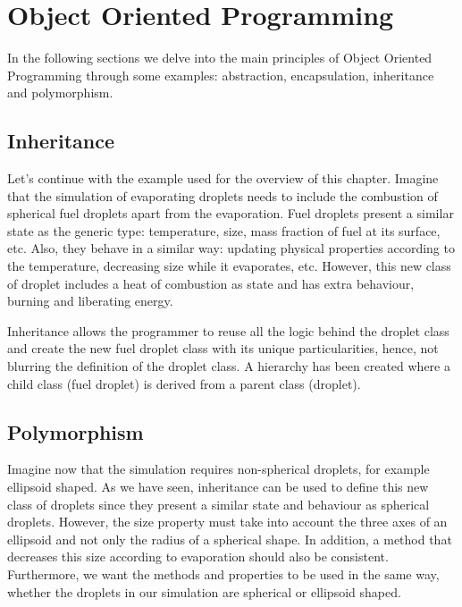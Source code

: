 \chapter{Object Oriented Programming} 


In the following sections we delve into the main principles of Object Oriented Programming through some examples: 
abstraction, encapsulation, inheritance and polymorphism. 


    \section{Inheritance}

Let's continue with the example used for the overview of this chapter. 
Imagine that the simulation of evaporating droplets needs to include the combustion of spherical fuel droplets apart from the evaporation.
Fuel droplets present a similar state as the generic type: temperature, size, mass fraction of fuel at its surface, etc.
Also, they behave in a similar way: updating physical properties according to the temperature, decreasing size while it evaporates, etc. 
However, this new class of droplet includes a heat of combustion as state and has extra behaviour, burning and liberating energy. 

Inheritance allows the programmer to reuse all the logic behind the droplet class 
and create the new fuel droplet class with its unique particularities, hence, not blurring the 
definition of the droplet class.
A hierarchy has been created where a child class (fuel droplet) is derived from a parent class (droplet).

 

    \section{Polymorphism} 

Imagine now that the simulation requires non-spherical droplets, for example ellipsoid shaped. 
As we have seen, inheritance can be used to define this new class of droplets since they present a similar state and behaviour as spherical droplets.
However, the size property must take into account the three axes of an ellipsoid and not only the radius of a spherical shape. 
In addition, a method that decreases this size according to evaporation should also be consistent. 
Furthermore, we want the methods and properties to be used in the same way, whether the droplets in our simulation are spherical or ellipsoid shaped.

